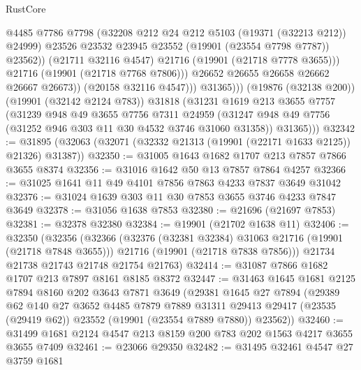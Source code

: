 \begin{lexlean}{RustCore}
\begin{coremodule}
                            @4485
                            @7786
                            @7798
                            (@32208 @212 @24 @212 @5103 (@19371 (@32213 @212)) @24999)
                            @23526
                            @23532
                            @23945
                            @23552
                            (@19901 (@23554 @7798 @7787))
                            @23562))
                        (@21711 @32116 @4547)
                        @21716
                        (@19901 (@21718 @7778 @3655)))
                      @21716
                      (@19901 (@21718 @7768 @7806)))
                    @26652
                    @26655
                    @26658
                    @26662
                    @26667
                    @26673))
                (@20158 @32116 @4547)))
            @31365)))
      (@19876 (@32138 @200))
      (@19901 (@32142 @2124 @783))
      @31818
      (@31231
        @1619
        @213
        @3655
        @7757
        (@31239
          @948
          @49
          @3655
          @7756
          @7311
          @24959
          (@31247 @948 @49 @7756 (@31252 @946 @303 @11 @30 @4532 @3746 @31060 @31358))
          @31365)))
@32342 := @31895 (@32063 (@32071 (@32332 @21313 (@19901 (@22171 @1633 @2125)) @21326) @31387))
@32350 := @31005 @1643 @1682 @1707 @213 @7857 @7866 @3655 @8374
@32356 := @31016 @1642 @50 @13 @7857 @7864 @4257
@32366 := @31025 @1641 @11 @49 @4101 @7856 @7863 @4233 @7837 @3649 @31042
@32376 := @31024 @1639 @303 @11 @30 @7853 @3655 @3746 @4233 @7847 @3649
@32378 := @31056 @1638 @7853
@32380 := @21696 (@21697 @7853)
@32381 := @32378 @32380
@32384 := @19901 (@21702 @1638 @11)
@32406 := @32350
    (@32356
      (@32366
        (@32376 (@32381 @32384) @31063 @21716 (@19901 (@21718 @7848 @3655)))
        @21716
        (@19901 (@21718 @7838 @7856)))
      @21734
      @21738
      @21743
      @21748
      @21754
      @21763)
@32414 := @31087 @7866 @1682 @1707 @213 @7897 @8161 @8185 @8372
@32447 := @31463
    @1645
    @1681
    @2125
    @7894
    @8160
    @202
    @3643
    @7871
    @3649
    (@29381
      @1645
      @27
      @7894
      (@29389
        @62
        @140
        @27
        @3652
        @4485
        @7879
        @7889
        @31311
        @29413
        @29417
        (@23535 (@29419 @62))
        @23552
        (@19901 (@23554 @7889 @7880))
        @23562))
@32460 := @31499 @1681 @2124 @4547 @213 @8159 @200 @783 @202 @1563 @4217 @3655 @3655 @7409
@32461 := @23066 @29350
@32482 := @31495
    @32461
    @4547
    @27
    @3759
    @1681

\end{coremodule}
\end{lexlean}
